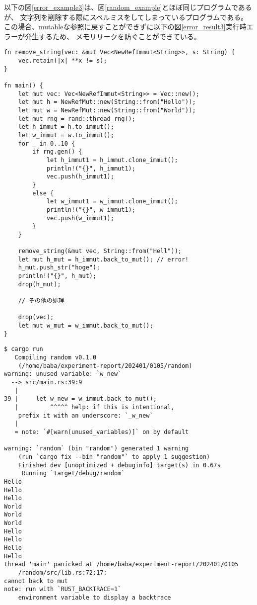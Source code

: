 \documentclass{sumiilab-paper}
\theoremstyle{mystyle}
\numberwithin{definition}{chapter} %
\begin{document}
以下の図\ref{error_example3}は、図\ref{random_example}とほぼ同じプログラムであるが、
文字列を削除する際にスペルミスをしてしまっているプログラムである。
この場合、mutableな参照に戻すことができずに以下の図\ref{error_result3}実行時エラーが発生するため、
メモリリークを防ぐことができている。
\begin{lstlisting}[caption=ユーザのミスを検出する例, 
  label=error_example3, captionpos=b]
  fn remove_string(vec: &mut Vec<NewRefImmut<String>>, s: String) {
    vec.retain(|x| **x != s);
}

fn main() {
    let mut vec: Vec<NewRefImmut<String>> = Vec::new();
    let mut h = NewRefMut::new(String::from("Hello"));
    let mut w = NewRefMut::new(String::from("World"));
    let mut rng = rand::thread_rng();
    let h_immut = h.to_immut();
    let w_immut = w.to_immut();
    for _ in 0..10 {
        if rng.gen() {
            let h_immut1 = h_immut.clone_immut();
            println!("{}", h_immut1);
            vec.push(h_immut1);
        }
        else {
            let w_immut1 = w_immut.clone_immut();
            println!("{}", w_immut1);
            vec.push(w_immut1);
        }
    }

    remove_string(&mut vec, String::from("Hell"));
    let mut h_mut = h_immut.back_to_mut(); // error!
    h_mut.push_str("hoge");
    println!("{}", h_mut);
    drop(h_mut);

    // その他の処理

    drop(vec);
    let mut w_mut = w_immut.back_to_mut();
}
\end{lstlisting}
\begin{lstlisting}[caption=ユーザのミスによるエラー, 
  label=error_result3, captionpos=b]
$ cargo run
   Compiling random v0.1.0 
    (/home/baba/experiment-report/202401/0105/random)
warning: unused variable: `w_new`
  --> src/main.rs:39:9
   |
39 |     let w_new = w_immut.back_to_mut();
   |         ^^^^^ help: if this is intentional,
    prefix it with an underscore: `_w_new`
   |
   = note: `#[warn(unused_variables)]` on by default

warning: `random` (bin "random") generated 1 warning 
    (run `cargo fix --bin "random"` to apply 1 suggestion)
    Finished dev [unoptimized + debuginfo] target(s) in 0.67s
     Running `target/debug/random`
Hello
Hello
Hello
World
World
World
Hello
Hello
Hello
Hello
thread 'main' panicked at /home/baba/experiment-report/202401/0105
    /random/src/lib.rs:72:17:
cannot back to mut
note: run with `RUST_BACKTRACE=1` 
    environment variable to display a backtrace
\end{lstlisting}
\end{document}
